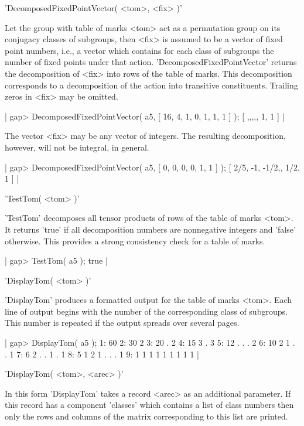 
'DecomposedFixedPointVector( <tom>, <fix> )'

Let the group with table of marks <tom> act as a permutation group on its
conjugacy  classes of subgroups, then  <fix> is assumed to be a vector of
fixed  point numbers, i.e., a vector which contains  for  each  class  of
subgroups   the   number   of   fixed   points    under    that   action.
'DecomposedFixedPointVector' returns the decomposition of <fix> into rows
of the table of marks. This decomposition  corresponds to a decomposition
of  the action into transitive constituents. Trailing  zeros in <fix> may
be omitted.

|    gap> DecomposedFixedPointVector( a5, [ 16, 4, 1, 0, 1, 1, 1 ] );
    [ ,,,,, 1, 1 ] |

The  vector  <fix>  may  be  any  vector  of  integers.    The  resulting
decomposition, however, will not be integral, in general.

|    gap> DecomposedFixedPointVector( a5, [ 0, 0, 0, 0, 1, 1 ] );
    [ 2/5, -1, -1/2,, 1/2, 1 ] |


'TestTom( <tom> )'

'TestTom' decomposes  all  tensor products of rows of  the table of marks
<tom>.  It returns 'true' if all  decomposition  numbers are  nonnegative
integers and 'false' otherwise.  This provides a strong consistency check
for a table of marks.

|    gap> TestTom( a5 );
    true |


'DisplayTom( <tom> )'

'DisplayTom' produces a formatted  output for the  table of  marks <tom>.
Each line of output begins with the number of the corresponding  class of
subgroups.  This number is repeated if  the  output spreads  over several
pages.

|    gap> DisplayTom( a5 );
    1:  60
    2:  30 2
    3:  20 . 2
    4:  15 3 . 3
    5:  12 . . . 2
    6:  10 2 1 . . 1
    7:   6 2 . . 1 . 1
    8:   5 1 2 1 . . . 1
    9:   1 1 1 1 1 1 1 1 1 |

'DisplayTom( <tom>, <arec> )'

In  this  form  'DisplayTom'  takes  a  record  <arec> as  an  additional
parameter.   If this record  has a component  'classes' which contains  a
list of  class  numbers then only  the  rows  and  columns of  the matrix
corresponding to this list are printed.

